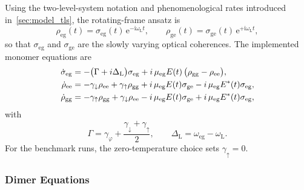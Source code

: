 Using the two-level-system notation and phenomenological rates introduced
in~\autoref{sec:model_tls}, the rotating-frame ansatz is
\begin{equation*}
\rho_{\mathrm{eg}}(t)=\sigma_{\mathrm{eg}}(t)\,\mathrm{e}^{-\mathrm{i}\omega_{\mathrm{L}} t},
\qquad
\rho_{\mathrm{ge}}(t)=\sigma_{\mathrm{ge}}(t)\,\mathrm{e}^{+\mathrm{i}\omega_{\mathrm{L}} t},
\end{equation*}
so that \(\sigma_{\mathrm{eg}}\) and \(\sigma_{\mathrm{ge}}\) are the slowly
varying optical coherences. The implemented monomer equations are
\begin{align}
\dot{\sigma}_{\mathrm{eg}}
&=
-\bigl(\Gamma + i\Delta_{\mathrm{L}}\bigr)\sigma_{\mathrm{eg}}
+ i\,\mu_{\mathrm{eg}} E(t)\,\bigl(\rho_{\mathrm{gg}}-\rho_{\mathrm{ee}}\bigr),
\label{eq:app_monomer_eom_sigma_eg}
\\
\dot{\rho}_{\mathrm{ee}}
&=
-\gamma_{\downarrow}\rho_{\mathrm{ee}}
+ \gamma_{\uparrow}\rho_{\mathrm{gg}}
+ i\,\mu_{\mathrm{eg}}E(t)\sigma_{\mathrm{ge}}
- i\,\mu_{\mathrm{eg}}E^{*}(t)\sigma_{\mathrm{eg}},
\notag
\\
\dot{\rho}_{\mathrm{gg}}
&=
-\gamma_{\uparrow}\rho_{\mathrm{gg}}
+ \gamma_{\downarrow}\rho_{\mathrm{ee}}
- i\,\mu_{\mathrm{eg}}E(t)\sigma_{\mathrm{ge}}
+ i\,\mu_{\mathrm{eg}}E^{*}(t)\sigma_{\mathrm{eg}},
\label{eq:app_monomer_eom_rho_gg}
\end{align}
with
\begin{equation*}
\Gamma = \gamma_{\varphi} + \frac{\gamma_{\downarrow}+\gamma_{\uparrow}}{2},
\qquad
\Delta_{\mathrm{L}}=\omega_{\mathrm{eg}}-\omega_{\mathrm{L}}.
\end{equation*}
For the benchmark runs, the zero-temperature choice sets \(\gamma_{\uparrow}=0\).

\subsubsection{Dimer Equations}

